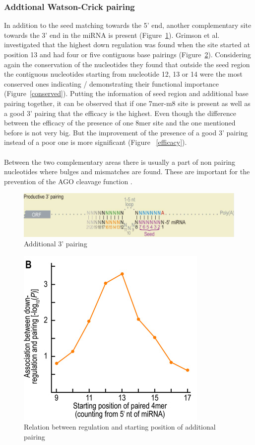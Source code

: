 \documentclass[12pt]{article}
\begin{document}
\subsubsection{Addtional Watson-Crick pairing}
In addition to the seed matching towards the 5' end, another complementary site towards the 3' end in the miRNA is present (Figure~\ref{addipairing}). Grimson et al. \cite{Grimson} investigated that the highest down regulation was found when the site started at position 13 and had four or five contiguous base pairings (Figure~\ref{siteregulation}). Considering again the conservation of the nucleotides they found that outside the seed region the contiguous nucleotides starting from nucleotide 12, 13 or 14 were the most conserved ones indicating / demonstrating their functional importance (Figure~\ref{conserved}). Putting the information of seed region and additional base pairing together, it can be observed that if one 7mer-m8 site is present as well as a good 3' pairing that the efficacy is the highest. Even though the difference between the efficacy of the presence of one 8mer site and the one mentioned before is not very big. But the improvement of the presence of a good 3' pairing instead of a poor one is more significant (Figure ~\ref{efficacy}).  \\\\
Between the two complementary areas there is usually a part of non pairing nucleotides where bulges and mismatches are found. These are important for the prevention of the AGO cleavage function \cite{Filipowicz}.

\begin{figure}[h]
\centering
\includegraphics[scale=0.3]{results/additional_pairing.PNG}
\caption{Additional 3' pairing}
\label{addipairing}
\end{figure}

\begin{figure}[h]
\centering
\includegraphics[scale=0.4]{results/sites_regulation.PNG} 
\caption{Relation between regulation and starting position of additional pairing}
\label{siteregulation}
\end{figure}
\end{document}
